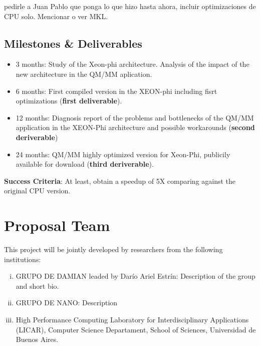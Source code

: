 \documentclass[a4paper,10pt]{article}
\begin{document}
pedirle a Juan Pablo que ponga lo que hizo hasta ahora, incluir optimizaciones de CPU solo. 
Mencionar o ver MKL.

\subsection{Milestones \& Deliverables}
\begin{itemize}
\item 3 months: Study of the Xeon-phi architecture. Analysis of the impact of the new architecture in the QM/MM aplication.

\item 6 months: First compiled version in the XEON-phi including fisrt optimizations (\textbf{first deliverable}).

\item 12 months: Diagnosis report of the problems and bottlenecks of the QM/MM application in the XEON-Phi architecture and possible workarounds (\textbf{second deriverable})

\item 24 months: QM/MM highly optimized version for Xeon-Phi, publicily available for download (\textbf{third deriverable}).
\end{itemize}

\begin{framed}
\textbf{Success Criteria}: At least, obtain a speedup of 5X comparing against the original CPU version. 
\end{framed}


\newpage

\section{Proposal Team}

This project will be jointly developed by researchers from the following institutions:
\begin{enumerate}[i)]
\item GRUPO DE DAMIAN leaded by Dar\'io Ariel Estr\'in: Description of the group and short bio.


\item GRUPO DE NANO: Description

\item High Performance Computing Laboratory for Interdisciplinary Applications (LICAR), Computer Science Departament, School of Sciences, Universidad de Buenos Aires.

\end{enumerate}
\end{document}
